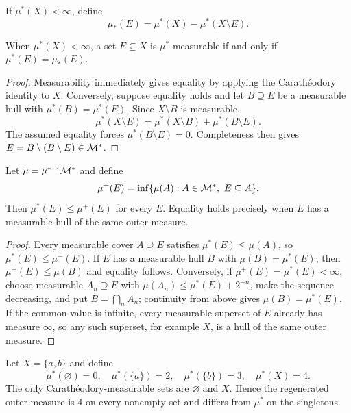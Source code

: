 \begin{de}
If $\mu^*(X)<\infty$, define
\[
\mu_*(E)=\mu^*(X)-\mu^*(X\setminus E).
\]
\end{de}

\begin{prop}
When $\mu^*(X)<\infty$, a set $E\subseteq X$ is $\mu^*$-measurable if and only if $\mu^*(E)=\mu_*(E)$.
\end{prop}

\begin{proof}
Measurability immediately gives equality by applying the Carath\'eodory identity to $X$. Conversely, suppose equality holds and let $B\supseteq E$ be a measurable hull with $\mu^*(B)=\mu^*(E)$. Since $X\setminus B$ is measurable,
\[
\mu^*(X\setminus E)
 =\mu^*(X\setminus B)+\mu^*(B\setminus E).
\]
The assumed equality forces $\mu^*(B\setminus E)=0$. Completeness then gives $E=B\setminus(B\setminus E)\in\mathcal{M}^*$.
\end{proof}

\begin{prop}
Let $\mu=\mu^*\mathbin{\upharpoonright}\mathcal{M}^*$ and define
\[
\mu^+(E)=\inf\{\mu(A):A\in\cM^*,\ E\subseteq A\}.
\]
Then $\mu^*(E)\leq\mu^+(E)$ for every $E$. Equality holds precisely when $E$ has a measurable hull of the same outer measure.
\end{prop}

\begin{proof}
Every measurable cover $A\supseteq E$ satisfies $\mu^*(E)\leq\mu(A)$, so $\mu^*(E)\leq\mu^+(E)$. If $E$ has a measurable hull $B$ with $\mu(B)=\mu^*(E)$, then $\mu^+(E)\leq\mu(B)$ and equality follows. Conversely, if $\mu^+(E)=\mu^*(E)<\infty$, choose measurable $A_n\supseteq E$ with $\mu(A_n)\leq\mu^*(E)+2^{-n}$, make the sequence decreasing, and put $B=\bigcap_nA_n$; continuity from above gives $\mu(B)=\mu^*(E)$. If the common value is infinite, every measurable superset of $E$ already has measure $\infty$, so any such superset, for example $X$, is a hull of the same outer measure.
\end{proof}

\begin{eg}
Let $X=\{a,b\}$ and define
\[
\mu^*(\varnothing)=0,\quad
\mu^*(\{a\})=2,\quad
\mu^*(\{b\})=3,\quad
\mu^*(X)=4.
\]
The only Carath\'eodory-measurable sets are $\varnothing$ and $X$. Hence the regenerated outer measure is $4$ on every nonempty set and differs from $\mu^*$ on the singletons.
\end{eg}

